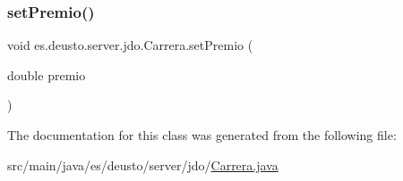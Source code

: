 \mbox{\label{classes_1_1deusto_1_1server_1_1jdo_1_1_carrera_a815210f549d1d724250882806f9b62c4}} 
\subsubsection{\texorpdfstring{setPremio()}{setPremio()}}
{\footnotesize\ttfamily void es.\+deusto.\+server.\+jdo.\+Carrera.\+set\+Premio (\begin{DoxyParamCaption}\item[{double}]{premio }\end{DoxyParamCaption})}



The documentation for this class was generated from the following file\+:\begin{DoxyCompactItemize}
\item 
src/main/java/es/deusto/server/jdo/\mbox{\hyperlink{_carrera_8java}{Carrera.\+java}}\end{DoxyCompactItemize}
